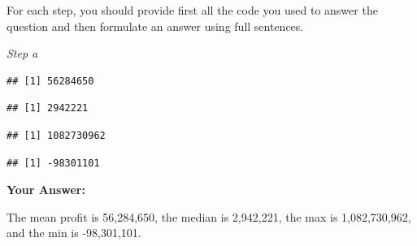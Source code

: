 \documentclass[
]{article}
\newenvironment{Shaded}{\begin{snugshade}}{\end{snugshade}}
\newcommand{\FunctionTok}[1]{\textcolor[rgb]{0.13,0.29,0.53}{\textbf{#1}}}
\newcommand{\NormalTok}[1]{#1}
\newcommand{\OtherTok}[1]{\textcolor[rgb]{0.56,0.35,0.01}{#1}}
\newcommand{\SpecialCharTok}[1]{\textcolor[rgb]{0.81,0.36,0.00}{\textbf{#1}}}
\begin{document}
For each step, you should provide first all the code you used to answer
the question and then formulate an answer using full sentences.

\emph{Step a}

\begin{Shaded}
\end{Shaded}

\begin{verbatim}
## [1] 56284650
\end{verbatim}

\begin{Shaded}
\end{Shaded}

\begin{verbatim}
## [1] 2942221
\end{verbatim}

\begin{Shaded}
\end{Shaded}

\begin{verbatim}
## [1] 1082730962
\end{verbatim}

\begin{Shaded}
\end{Shaded}

\begin{verbatim}
## [1] -98301101
\end{verbatim}

\textbf{Your Answer:}

The mean profit is 56,284,650, the median is 2,942,221, the max is
1,082,730,962, and the min is -98,301,101.
\end{document}
